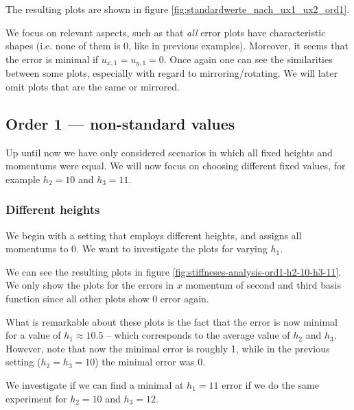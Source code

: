 \documentclass{article}
\begin{document}
The resulting plots are shown in figure \ref{fig:standardwerte_nach_ux1_ux2_ord1}.



We focus on relevant aspects, such as that \emph{all} error plots have characteristic shapes (i.e. none of them is 0, like in previous examples). Moreover, it seems that the error is minimal if $u_{x,1}=u_{y,1}=0$. Once again one can see the similarities between some plots, especially with regard to mirroring/rotating. We will later omit plots that are the same or mirrored.

\clearpage{} %

\subsection{Order 1 --- non-standard values}
\label{sec:stiffness-analysis-ord1-non-std-values}

Up until now we have only considered scenarios in which all fixed heights and momentums were equal. We will now focus on choosing different fixed values, for example $h_2=10$ and $h_3=11$.

\subsubsection{Different heights}
\label{sec:stiffness-analysis-ord1-differing-h2-10-h3-11}

We begin with a setting that employs different heights, and assigns all momentums to 0. We want to investigate the plots for varying $h_1$.



We can see the resulting plots in figure \ref{fig:stiffneses-analysis-ord1-h2-10-h3-11}. We only show the plots for the errors in $x$ momentum of second and third basis function since all other plots show 0 error again.

What is remarkable about these plots is the fact that the error is now minimal for a value of $h_1\approx 10.5$ -- which corresponds to the average value of $h_2$ and $h_3$. However, note that now the minimal error is roughly 1, while in the previous setting ($h_2=h_3=10$) the minimal error was 0.

We investigate if we can find a minimal at $h_1=11$ error if we do the same experiment for $h_2=10$ and $h_3=12$.


\end{document}
